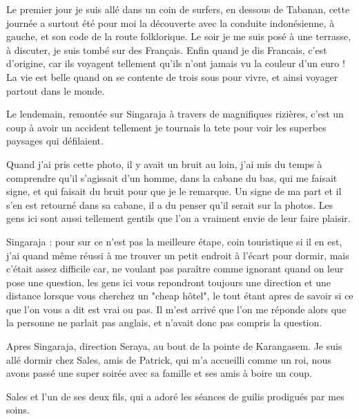 {%

Le premier jour je suis allé dans un coin de surfers, en dessous de Tabanan, cette journée a surtout été pour moi la découverte avec la conduite indonésienne, à gauche, et son code de la route folklorique. Le soir je me suis posé à une terrasse, à discuter, je suis tombé sur des Français. Enfin quand je dis Francais, c'est d'origine, car ils voyagent tellement qu'ils n'ont jamais vu la couleur d'un euro ! La vie est belle quand on se contente de trois sous pour vivre, et ainsi voyager partout dans le monde.

Le lendemain, remontée sur Singaraja à travers de magnifiques rizières, c'est un coup à avoir un accident tellement je tournais la tete pour voir les superbes paysages qui défilaient.

{%

{%

{%

{%

Quand j'ai pris cette photo, il y avait un bruit au loin, j'ai mis du temps à comprendre qu'il s'agissait d'un homme, dans la cabane du bas, qui me faisait signe, et qui faisait du bruit pour que je le remarque. Un signe de ma part et il s'en est retourné dans sa cabane, il a du penser qu'il serait sur la photos. Les gens ici sont aussi tellement gentils que l'on a vraiment envie de leur faire plaisir.

Singaraja : pour sur ce n'est pas la meilleure étape, coin touristique si il en est, j'ai quand même réussi à me trouver un petit endroit à l'écart pour dormir, mais c'était assez difficile car, ne voulant pas paraître comme ignorant quand on leur pose une question, les gens ici vous repondront toujours une direction et une distance lorsque vous cherchez un "cheap hôtel", le tout étant apres de savoir si ce que l'on vous a dit est vrai ou pas. Il m'est arrivé que l'on me réponde alors que la personne ne parlait pas anglais, et n'avait donc pas compris la question.

Apres Singaraja, direction Seraya, au bout de la pointe de Karangasem. Je suis allé dormir chez Sales, amis de Patrick, qui m'a accueilli comme un roi, nous avons passé une super soirée avec sa famille et ses amis à boire un coup.

Sales et l'un de ses deux fils, qui a adoré les séances de guilis prodigués par mes soins.  

}}}}}
